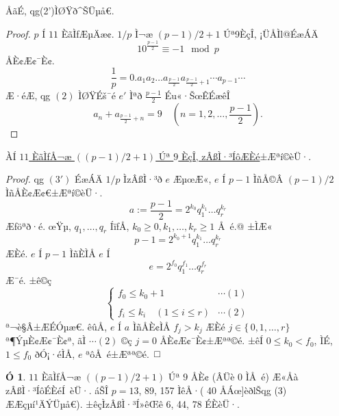 \documentclass{jsarticle}
\theoremstyle{definition}
\newtheorem*{remark*}{Ó}
\begin{document}
ÅãÉ, qg(2')ÌØŸð^ŠÜµå€.
\begin{center}
\end{center}
\begin{proof}
$p$ Í $11$ ÈãÌfÆµÄæ¢. $1/p$ Ì¬æ $(p-1)/2+1$ Úª9ÈçÎ, ¡ÜÅÌl@ÉæÁÄ
\[
10^{\frac{p-1}{2}}\equiv -1 \mod p
\]
ÅÈ¢Æ¢¯È¢.
\[
\frac{1}{p}=0.a_1a_2\dots a_{\frac{p-1}{2}}a_{\frac{p-1}{2}+1}\cdots a_{p-1}\cdots
\]
Æ·éÆ, qg $(2)$ ÌØŸÉš¯é $e'$ Ìªð $\frac{p-1}{2}$ Éu«·ŠœÊÉæêÎ
\[
a_n+a_{\frac{p-1}{2}+n}=9\quad \left(n=1,2,\ldots ,\frac{p-1}{2}\right).
\]
\end{proof}
\begin{center}
\end{center}

ÀÍ \underline{$11$ ÈãÌfÅ¬æ $((p-1)/2+1)$ Úª $9$ ÈçÎ, zÂßÌ·³ÍôÆÈé}±Æªí©èÜ·.
\begin{proof}
qg $(3')$ ÉæÁÄ $1/p$ ÌzÂßÌ·³ð $e$ ÆµœÆ«, $e$ Í $p-1$ ÌñÅ©Â $(p-1)/2$ÌñÅÈ¢Æ¢€±Æªí©èÜ·.
\[
a:=\frac{p-1}{2}=2^{k_0} q_1^{k_1}\dots q_r^{k_r}
\]
Æföªð·é.
œŸµ, $q_1,\dots,q_r$ ÍïfÅ, $k_0 \geq 0 , k_1,\dots , k_r \geq 1$ Å é.@
±ÌÆ«
\[
p-1=2^{k_0+1}q_1^{k_1}\dots q_r^{k_r}
\]
ÆÈé. $e$ Í $p-1$ ÌñÈÌÅ $e$ Í
\[
e=2^{f_0}q_1^{f_1}\dots q_r^{f_r}
\]
Æ¯é.
±ê©ç
\[
\begin{cases}
 f_0\leq k_0+1 				 &\cdots (1)
\\
\\
 f_i\leq k_i\quad (1\leq i\leq r)&\cdots (2)
\end{cases}
\]
ª¬è§Â±ÆÉÓµæ€.
êûÅ,
$e$ Í $a$ ÌñÅÈ¢ÌÅ $f_j>k_j$ ÆÈé $j\in \{\, 0,1,\dots ,r\}$ ª¶ÝµÈ¢Æ¢¯È¢ª,
ãÌ $\cdots(2)$ ©ç $j=0$ ÅÈ¢Æ¢¯È¢±Æªª©é.
±êÍ $0\leq k_0<f_0$, ÌÉ, $1\leq f_0$ ðÓ¡·éÌÅ, $e$ ªôÅ é±Æªª©é.
\end{proof}
\begin{remark*}

$11$ ÈãÌfÅ¬æ $((p-1)/2+1)$ Úª $9$ ÅÈ¢ (ÂÜè 0 ÌÅ é) Æ«Åà
zÂßÌ·³ÍôÉÈéÍ èÜ·.
áŠÎ $p=13$, 89, 157 ÌêÅ·( 40 ÅÁœ]èðlŠqg (3) ÆÆçµí¹ÄÝÜµå€).
±êçÌzÂßÌ·³Í»êŒê 6, 44, 78 ÉÈèÜ·.
\end{remark*}
\newpage
\begin{center}
\end{center}
\end{document}
